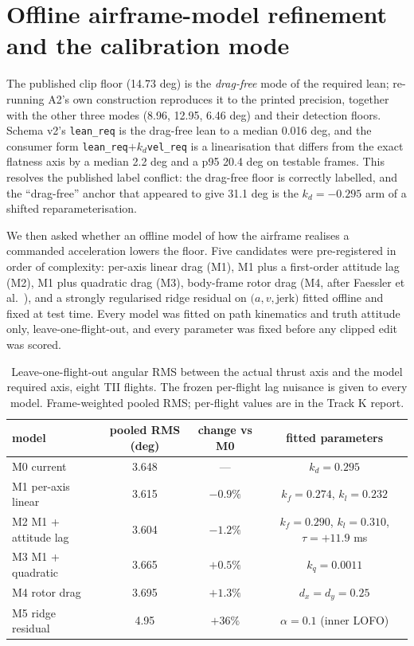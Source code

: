 
\section{Offline airframe-model refinement and the calibration mode}
\label{sec:k-physics}

The published clip floor (14.73 deg) is the \emph{drag-free} mode of the required lean;
re-running A2's own construction reproduces it to the printed precision, together with the
other three modes (8.96, 12.95, 6.46 deg) and their detection floors.  Schema v2's
\texttt{lean\_req} is the drag-free lean to a median 0.016 deg, and the consumer form
\texttt{lean\_req}$+k_d$\texttt{vel\_req} is a linearisation that differs from the exact
flatness axis by a median 2.2 deg and a p95 20.4 deg on testable frames.  This resolves the
published label conflict: the drag-free floor is correctly labelled, and the ``drag-free''
anchor that appeared to give 31.1 deg is the $k_d=-0.295$ arm of a shifted reparameterisation.

We then asked whether an offline model of how the airframe realises a commanded
acceleration lowers the floor.  Five candidates were pre-registered in order of complexity:
per-axis linear drag (M1), M1 plus a first-order attitude lag (M2), M1 plus quadratic drag
(M3), body-frame rotor drag (M4, after Faessler et al.\ \cite{faessler2018flatness}), and a
strongly regularised ridge residual on $(a,v,$jerk$)$ fitted offline and fixed at test time.
Every model was fitted on path kinematics and truth attitude only, leave-one-flight-out,
and every parameter was fixed before any clipped edit was scored.

\begin{table}[t]
\centering
\caption{Leave-one-flight-out angular RMS between the actual thrust axis and the model
required axis, eight TII flights.  The frozen per-flight lag nuisance is given to every
model.  Frame-weighted pooled RMS; per-flight values are in the Track K report.}
\label{tab:k-models}
\begin{tabular}{lccc}
\toprule
model & pooled RMS (deg) & change vs M0 & fitted parameters \\
\midrule
M0 current            & 3.648 & ---      & $k_d=0.295$ \\
M1 per-axis linear    & 3.615 & $-0.9\%$ & $k_f=0.274$, $k_l=0.232$ \\
M2 M1 + attitude lag  & 3.604 & $-1.2\%$ & $k_f=0.290$, $k_l=0.310$, $\tau=+11.9$ ms \\
M3 M1 + quadratic     & 3.665 & $+0.5\%$ & $k_q=0.0011$ \\
M4 rotor drag         & 3.695 & $+1.3\%$ & $d_x=d_y=0.25$ \\
M5 ridge residual     & 4.95  & $+36\%$ & $\alpha=0.1$ (inner LOFO) \\
\bottomrule
\end{tabular}
\end{table}

